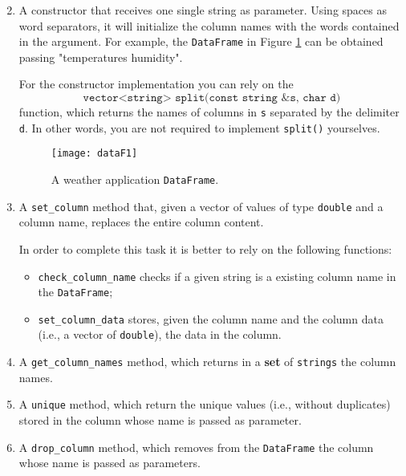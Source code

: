 \begin{enumerate}
\setcounter{enumi}{1}

\item A constructor that receives one single string as parameter. Using spaces as word
separators, it will initialize the column names with the words contained in the argument.
For example, the \texttt{DataFrame} in Figure \ref{dataF1} can be obtained passing "temperatures
humidity".

For the constructor implementation you can rely on the
\begin{equation*}
    \texttt{vector<string> split(const string \& s, char d)}
\end{equation*}
function, which returns the names of columns in \texttt{s} separated by the delimiter \texttt{d}. In other words, you are not required to implement \texttt{split()} yourselves.

\begin{figure}[h]
\begin{center}
  \texttt{[image: dataF1]}
\end{center}
\caption{A weather application \texttt{DataFrame}.}
\label{dataF1}
\end{figure}

\item A \texttt{set\_column} method that, given a vector of values of type \texttt{double} and a column name, replaces the entire column content.

In order to complete this task it is better to rely on the following functions:
\begin{itemize}
    \item \texttt{check\_column\_name} checks if a given string is a existing column name in the \texttt{DataFrame};

    \item \texttt{set\_column\_data} stores, given the column name and the column data (i.e., a vector of \texttt{double}), the data in the column.
\end{itemize}

\item A \texttt{get\_column\_names} method, which returns in a \textbf{set} of \texttt{strings} the column names.

\item A \texttt{unique} method, which return the unique values (i.e., without duplicates) stored in the column whose name is passed as parameter.

\item A \texttt{drop\_column} method, which removes from the \texttt{DataFrame} the column whose name is passed as parameters.


\end{enumerate}
